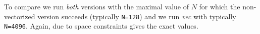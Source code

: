 To compare we run {\em both} versions with the maximal value of $N$ for which the non-vectorized version succeeds (typically {\tt N=128}) and we run {\em vec} with typically {\tt N=4096}.
Again, due to space constraints \cite{Anon_TR} gives the exact values.




